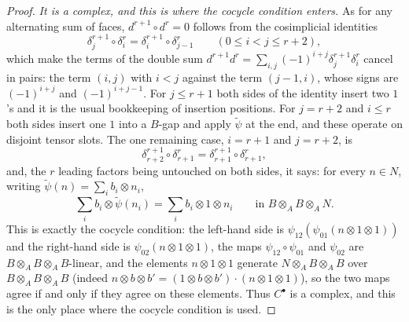 \begin{proof}
\emph{It is a complex, and this is where the cocycle condition enters.}
As for any alternating sum of faces, $d^{r+1}\circ d^r=0$ follows from
the cosimplicial identities
\[
\delta^{r+1}_j\circ\delta^r_i=\delta^{r+1}_i\circ\delta^r_{j-1}
\qquad(0\le i<j\le r+2),
\]
which make the terms of the double sum $d^{r+1}d^r=
\sum_{i,j}(-1)^{i+j}\delta^{r+1}_j\delta^r_i$ cancel in pairs: the term
$(i,j)$ with $i<j$ against the term $(j-1,i)$, whose signs are
$(-1)^{i+j}$ and $(-1)^{i+j-1}$.  For $j\le r+1$ both sides of the
identity insert two $1$'s and it is the usual bookkeeping of insertion
positions.  For $j=r+2$ and $i\le r$ both sides insert one $1$ into a
$B$-gap and apply $\widetilde\psi$ at the end, and these operate on
disjoint tensor slots.  The one remaining case, $i=r+1$ and $j=r+2$,
is
\[
\delta^{r+1}_{r+2}\circ\delta^r_{r+1}=
\delta^{r+1}_{r+1}\circ\delta^r_{r+1},
\]
and, the $r$ leading factors being untouched on both sides, it says: for
every $n\in N$, writing $\widetilde\psi(n)=\sum_ib_i\otimes n_i$,
\[
\sum_ib_i\otimes\widetilde\psi(n_i)=\sum_ib_i\otimes1\otimes n_i
\qquad\text{in }B\otimes_AB\otimes_AN.
\]
This is exactly the cocycle condition: the left-hand side is
$\psi_{12}(\psi_{01}(n\otimes1\otimes1))$ and the right-hand side is
$\psi_{02}(n\otimes1\otimes1)$, the maps $\psi_{12}\circ\psi_{01}$ and
$\psi_{02}$ are $B\otimes_AB\otimes_AB$-linear, and the elements
$n\otimes1\otimes1$ generate $N\otimes_AB\otimes_AB$ over
$B\otimes_AB\otimes_AB$ (indeed
$n\otimes b\otimes b'=(1\otimes b\otimes b')\cdot(n\otimes1\otimes1)$),
so the two maps agree if and only if they agree on these elements.
Thus $C^\bullet$ is a complex, and this is the only place where the
cocycle condition is used.


\end{proof}
